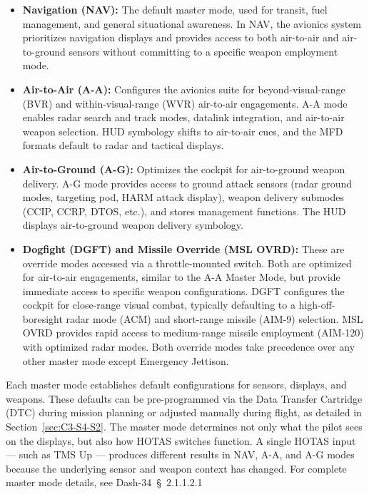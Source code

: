 \documentclass[11pt, a4paper, twoside]{report}
\providecommand{\dashref}[1]{Dash-34~\S~#1}
\begin{document}
\begin{itemize}
	\item \textbf{Navigation (NAV):} The default master mode, used for transit, fuel management, and general situational awareness. In NAV, the avionics system prioritizes navigation displays and provides access to both air-to-air and air-to-ground sensors without committing to a specific weapon employment mode.
	
	\item \textbf{Air-to-Air (A-A):} Configures the avionics suite for beyond-visual-range (BVR) and within-visual-range (WVR) air-to-air engagements. A-A mode enables radar search and track modes, datalink integration, and air-to-air weapon selection. HUD symbology shifts to air-to-air cues, and the MFD formats default to radar and tactical displays.
	
	\item \textbf{Air-to-Ground (A-G):} Optimizes the cockpit for air-to-ground weapon delivery. A-G mode provides access to ground attack sensors (radar ground modes, targeting pod, HARM attack display), weapon delivery submodes (CCIP, CCRP, DTOS, etc.), and stores management functions. The HUD displays air-to-ground weapon delivery symbology.
	
	\item \textbf{Dogfight (DGFT) and Missile Override (MSL OVRD):} These are override 	modes accessed via a throttle-mounted switch. Both are optimized for air-to-air engagements, similar to the A-A Master Mode, but provide immediate access to specific weapon configurations. DGFT configures the cockpit for close-range visual combat, typically defaulting to a high-off-boresight radar mode (ACM) and short-range missile (AIM-9) selection. MSL OVRD provides rapid access to medium-range missile employment (AIM-120) with optimized radar modes. Both override modes take precedence over any other master mode except Emergency Jettison.
\end{itemize}

Each master mode establishes default configurations for sensors, displays, and weapons. These defaults can be pre-programmed via the Data Transfer Cartridge (DTC) during mission planning or adjusted manually during flight, as detailed in Section~\ref{sec:C3-S4-S2}. The master mode determines not only what the pilot sees on the displays, but also how HOTAS switches function. A single HOTAS input — such as TMS Up — produces different results in NAV, A-A, and A-G modes because the underlying sensor and weapon context has changed. For complete master mode details, see \dashref{2.1.1.2.1}
\end{document}
